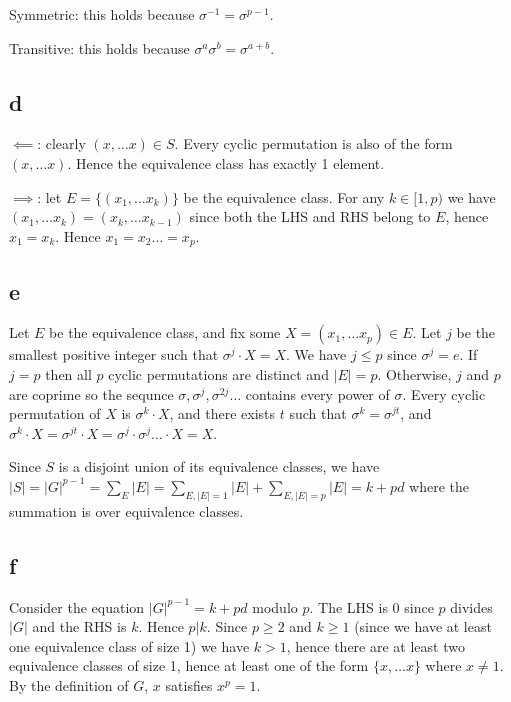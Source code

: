 \documentclass{article}
\def\inv{{-1}}
\begin{document}
Symmetric: this holds because $\sigma^\inv = \sigma^{p-1}$.

Transitive: this holds because $\sigma^a \sigma^b = \sigma^{a+b}$.

\subsection*{d}

$\impliedby$: clearly $(x, \ldots x) \in S$. Every cyclic permutation is also of the form $(x, \ldots x)$. Hence the equivalence class has exactly 1 element.

$\implies$: let $E = \{(x_1, \ldots x_k)\}$ be the equivalence class. For any $k \in [1, p)$ we have $(x_1, \ldots x_k) = (x_k, \ldots x_{k-1})$ since both the LHS and RHS belong to $E$, hence $x_1 = x_k$. Hence $x_1 = x_2 \ldots = x_p$. 

\subsection*{e}

Let $E$ be the equivalence class, and fix some $X = (x_1, \ldots x_p) \in E$. Let $j$ be the smallest positive integer such that $\sigma^j \cdot X = X$. We have $j \le p$ since $\sigma^j = e$. If $j = p$ then all $p$ cyclic permutations are distinct and $|E| = p$. Otherwise, $j$ and $p$ are coprime so the sequnce $\sigma, \sigma^j, \sigma^{2j} \ldots$ contains every power of $\sigma$. Every cyclic permutation of $X$ is $\sigma^k \cdot X$, and there exists $t$ such that $\sigma^k = \sigma^{jt}$, and $\sigma^k \cdot X = \sigma^{jt} \cdot X = \sigma^j \cdot \sigma^j \ldots \cdot X = X$.

Since $S$ is a disjoint union of its equivalence classes, we have $|S| = |G|^{p-1} = \sum_E |E| = \sum_{E, |E| = 1} |E| + \sum_{E, |E| = p} |E| = k + pd$ where the summation is over equivalence classes. 

\subsection*{f}

Consider the equation $|G|^{p-1} = k + pd$ modulo $p$. The LHS is $0$ since $p$ divides $|G|$ and the RHS is $k$. Hence $p | k$. Since $p \ge 2$ and $k \ge 1$ (since we have at least one equivalence class of size 1) we have $k > 1$, hence there are at least two equivalence classes of size 1, hence at least one of the form $\{x, \ldots x\}$ where $x \ne 1$. By the definition of $G$, $x$ satisfies $x^p = 1$.




\end{document}
